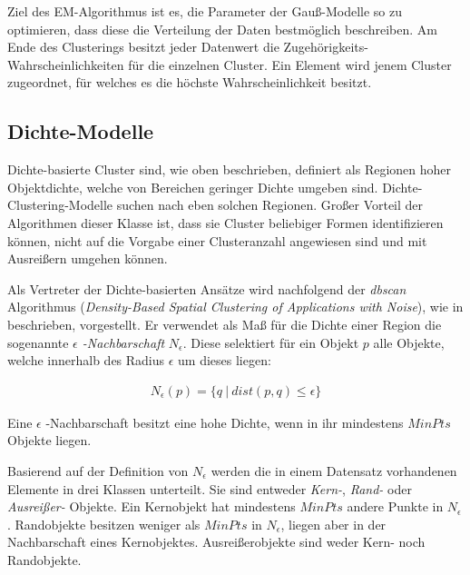 Ziel des EM-Algorithmus ist es, die Parameter der Gauß-Modelle so zu optimieren, dass diese die Verteilung der Daten bestmöglich beschreiben.
Am Ende des Clusterings besitzt jeder Datenwert die Zugehörigkeits-Wahrscheinlichkeiten für die einzelnen Cluster.
Ein Element wird jenem Cluster zugeordnet, für welches es die höchste Wahrscheinlichkeit besitzt.

\subsection{Dichte-Modelle}
\label{sec:grund_density_clustering}

Dichte-basierte Cluster sind, wie oben beschrieben, definiert als Regionen hoher Objektdichte, welche
von Bereichen geringer Dichte umgeben sind. Dichte-Clustering-Modelle suchen nach eben solchen Regionen.
Großer Vorteil der Algorithmen dieser Klasse ist, dass sie Cluster beliebiger Formen identifizieren können,
nicht auf die Vorgabe einer Clusteranzahl angewiesen sind und mit Ausreißern umgehen können.

Als Vertreter der Dichte-basierten Ansätze wird nachfolgend der \textit{\acrshort*{dbscan}} Algorithmus
(\textit{Density-Based Spatial Clustering of Applications with Noise}), wie in \cite[]{Gao2012} beschrieben, vorgestellt.
Er verwendet als Maß für die Dichte einer Region die sogenannte \textit{$\epsilon$ -Nachbarschaft} $N_{\epsilon}$.
Diese selektiert für ein Objekt $p$ alle Objekte, welche innerhalb des Radius $\epsilon$ um dieses liegen:

\begin{ceqn}
\begin{align}
    \label{eq_dbscan_1}
    N_{\epsilon}(p) = \{ q\ |\ dist(p,q) \leq \epsilon \}
\end{align}
\end{ceqn}

Eine $\epsilon$ -Nachbarschaft besitzt eine hohe Dichte, wenn in ihr mindestens $MinPts$ Objekte liegen.

Basierend auf der Definition von $N_{\epsilon}$ werden die in einem Datensatz vorhandenen Elemente in
drei Klassen unterteilt. Sie sind entweder \textit{Kern-}, \textit{Rand-} oder \textit{Ausreißer-} Objekte.
Ein Kernobjekt hat mindestens $MinPts$ andere Punkte in $N_{\epsilon}$.
Randobjekte besitzen weniger als $MinPts$ in $N_{\epsilon}$, liegen aber in der Nachbarschaft eines Kernobjektes.
Ausreißerobjekte sind weder Kern- noch Randobjekte.

